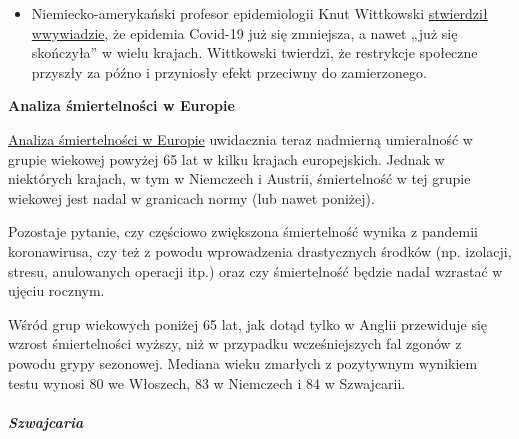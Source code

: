 \begin{itemize}
{  jest przenoszony przez aerozole} (nie rozprzestrzenia się przez
  powietrze). Zakażenie odbywa się głównie poprzez bezpośredni kontakt
  lub infekcję kropelkową (kaszel, kichanie).
\item
  Niemiecko-amerykański profesor epidemiologii Knut Wittkowski
  \href{https://www.youtube.com/watch?v=ARTf4bpiXuI}{stwierdził
  w}\href{https://www.youtube.com/watch?v=ARTf4bpiXuI}{wywiadzie}, że
  epidemia Covid-19 już się zmniejsza, a nawet „już się skończyła'' w
  wielu krajach. Wittkowski twierdzi, że restrykcje społeczne przyszły
  za późno i przyniosły efekt przeciwny do zamierzonego.
\end{itemize}

\textbf{Analiza śmiertelności w Europie}

\href{https://www.euromomo.eu/outputs/zscore_country_total.html}{Analiza
śmiertelności w Europie} uwidacznia teraz nadmierną umieralność w grupie
wiekowej powyżej 65 lat w kilku krajach europejskich. Jednak w
niektórych krajach, w tym w Niemczech i Austrii, śmiertelność w tej
grupie wiekowej jest nadal w granicach normy (lub nawet poniżej).

Pozostaje pytanie, czy częściowo zwiększona śmiertelność wynika z
pandemii koronawirusa, czy też z powodu wprowadzenia drastycznych
środków (np. izolacji, stresu, anulowanych operacji itp.) oraz czy
śmiertelność będzie nadal wzrastać w ujęciu rocznym.

Wśród grup wiekowych poniżej 65 lat, jak dotąd tylko w Anglii przewiduje
się wzrost śmiertelności wyższy, niż w przypadku wcześniejszych fal
zgonów z powodu grypy sezonowej. Mediana wieku zmarłych z pozytywnym
wynikiem testu wynosi 80 we Włoszech, 83 w Niemczech i 84 w Szwajcarii.

\hypertarget{szwajcaria-1}{%
\subparagraph{\texorpdfstring{\textbf{Szwajcaria}}{Szwajcaria}}\label{szwajcaria-1}}

